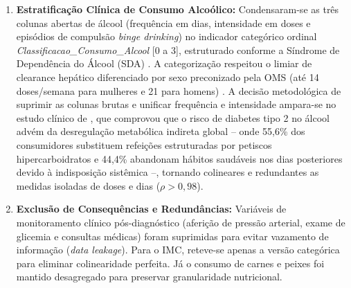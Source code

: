 \documentclass[12pt, a4paper]{article}
\begin{document}
\begin{enumerate}
        \item \textbf{Estratificação Clínica de Consumo Alcoólico:} Condensaram-se as três colunas abertas de álcool (frequência em dias, intensidade em doses e episódios de compulsão \textit{binge drinking}) no indicador categórico ordinal \textit{Classificacao\_Consumo\_Alcool} [0 a 3], estruturado conforme a Síndrome de Dependência do Álcool (SDA) \cite{gigliotti2004sindrome}. A categorização respeitou o limiar de clearance hepático diferenciado por sexo preconizado pela OMS (até 14 doses/semana para mulheres e 21 para homens) \cite{gigliotti2004sindrome}. A decisão metodológica de suprimir as colunas brutas e unificar frequência e intensidade ampara-se no estudo clínico de \cite{olivatto2018analise}, que comprovou que o risco de diabetes tipo 2 no álcool advém da desregulação metabólica indireta global – onde 55,6\% dos consumidores substituem refeições estruturadas por petiscos hipercarboidratos e 44,4\% abandonam hábitos saudáveis nos dias posteriores devido à indisposição sistêmica –, tornando colineares e redundantes as medidas isoladas de doses e dias ($\rho > 0,98$).
        \item \textbf{Exclusão de Consequências e Redundâncias:} Variáveis de monitoramento clínico pós-diagnóstico (aferição de pressão arterial, exame de glicemia e consultas médicas) foram suprimidas para evitar vazamento de informação (\textit{data leakage}). Para o IMC, reteve-se apenas a versão categórica para eliminar colinearidade perfeita. Já o consumo de carnes e peixes foi mantido desagregado para preservar granularidade nutricional.
    \end{enumerate}
\end{document}
